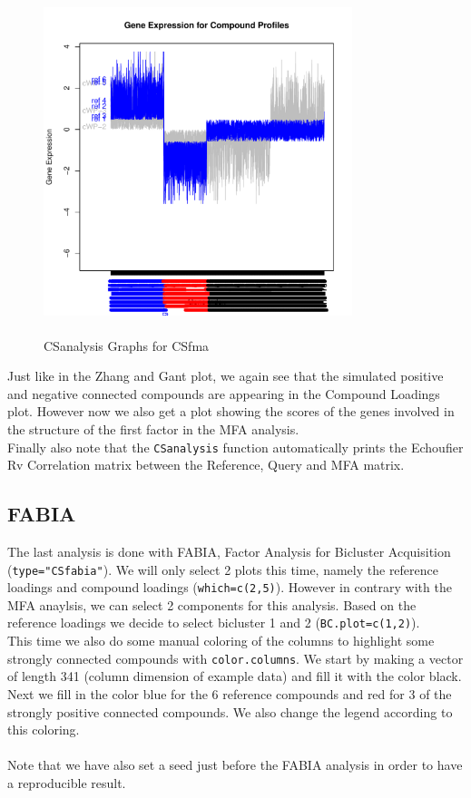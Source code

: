 \documentclass[a4paper]{article}\usepackage[]{graphicx}\usepackage[]{color}
\newenvironment{knitrout}{}{} %
\begin{document}
\begin{knitrout}
\begin{figure}[H]
\includegraphics[width=9cm,height=10cm]{figure/MFA-4} \hfill{}

\caption[CSanalysis Graphs for CSfma]{CSanalysis Graphs for CSfma\label{fig:MFA}}
\end{figure}


\end{knitrout}

\noindent Just like in the Zhang and Gant plot, we again see that the simulated
positive and negative connected compounds are appearing in the Compound Loadings
plot. However now we also get a plot showing the scores of the genes involved in
the structure of the first factor in the MFA analysis.\\
Finally also note that the \texttt{CSanalysis} function automatically prints the
Echoufier Rv Correlation matrix between the Reference, Query and MFA matrix.


\subsection{FABIA}
The last analysis is done with FABIA, Factor Analysis for Bicluster Acquisition
(\texttt{type="CSfabia"}). We will only select 2 plots this time, namely the
reference loadings and compound loadings (\texttt{which=c(2,5)}). However in
contrary with the MFA anaylsis, we can select 2 components for this analysis.
Based on the reference loadings we decide to select bicluster 1 and 2
(\texttt{BC.plot=c(1,2)}). \\
This time we also do some manual coloring of the columns to highlight some
strongly connected compounds with \texttt{color.columns}. We start by making a vector of length
341 (column dimension of example data) and fill it with the color black. Next we fill in the
color blue for the 6 reference compounds and red for 3 of the strongly positive
connected compounds. We also change the legend according to this coloring.\\ \\
Note that we have also set a seed just before the FABIA analysis in order to
have a reproducible result.
\end{document}

